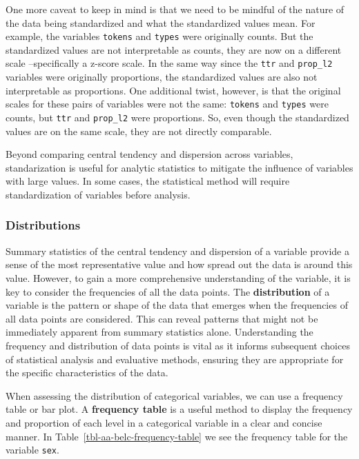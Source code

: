 \documentclass[
  letterpaper,
  DIV=11,
  numbers=noendperiod]{scrreport}
\theoremstyle{definition}
\theoremstyle{remark}
\begin{document}
One more caveat to keep in mind is that we need to be mindful of the
nature of the data being standardized and what the standardized values
mean. For example, the variables \texttt{tokens} and \texttt{types} were
originally counts. But the standardized values are not interpretable as
counts, they are now on a different scale --specifically a z-score
scale. In the same way since the \texttt{ttr} and \texttt{prop\_l2}
variables were originally proportions, the standardized values are also
not interpretable as proportions. One additional twist, however, is that
the original scales for these pairs of variables were not the same:
\texttt{tokens} and \texttt{types} were counts, but \texttt{ttr} and
\texttt{prop\_l2} were proportions. So, even though the standardized
values are on the same scale, they are not directly comparable.

Beyond comparing central tendency and dispersion across variables,
standarization is useful for analytic statistics to mitigate the
influence of variables with large values. In some cases, the statistical
method will require standardization of variables before analysis.

\hypertarget{distributions}{%
\subsubsection{Distributions}\label{distributions}}

Summary statistics of the central tendency and dispersion of a variable
provide a sense of the most representative value and how spread out the
data is around this value. However, to gain a more comprehensive
understanding of the variable, it is key to consider the frequencies of
all the data points. The \textbf{distribution} of a variable is the
pattern or shape of the data that emerges when the frequencies of all
data points are considered. This can reveal patterns that might not be
immediately apparent from summary statistics alone. Understanding the
frequency and distribution of data points is vital as it informs
subsequent choices of statistical analysis and evaluative methods,
ensuring they are appropriate for the specific characteristics of the
data.

When assessing the distribution of categorical variables, we can use a
frequency table or bar plot. A \textbf{frequency table} is a useful
method to display the frequency and proportion of each level in a
categorical variable in a clear and concise manner. In
Table~\ref{tbl-aa-belc-frequency-table} we see the frequency table for
the variable \texttt{sex}.
\end{document}
